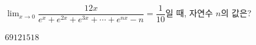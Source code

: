 $\displaystyle\lim_{x\to 0}\dfrac{12x}{e^x+e^{2x}+e^{3x}+\cdots+e^{nx}-n}=\dfrac{1}{10}$일 때, 자연수 $n$의 값은?
\begin{choices32}{$6$}{$9$}{$12$}{$15$}{$18$}\end{choices32}
